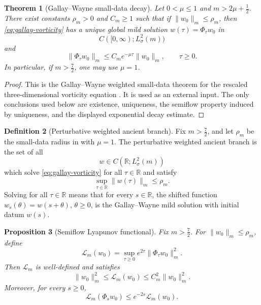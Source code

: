 \documentclass[11pt]{amsart}
\theoremstyle{plain}
\newtheorem{theorem}{Theorem}[section]
\newtheorem{proposition}[theorem]{Proposition}
\theoremstyle{definition}
\newtheorem{definition}[theorem]{Definition}
\theoremstyle{remark}
\numberwithin{equation}{section}
\begin{document}
\begin{theorem}[Gallay--Wayne small-data decay]\label{thm:gallay}
Let \(0<\mu\le1\) and \(m>2\mu+\frac12\).  There exist constants
\(\rho_m>0\) and \(C_m\ge1\) such that if
\(\|w_0\|_m\le\rho_m\), then \eqref{eq:gallay-vorticity} has a unique global
mild solution \(w(\tau)=\Phi_\tau w_0\) in
\[
   C([0,\infty);L^2_\sigma(m))
\]
and
\[
   \|\Phi_\tau w_0\|_m
   \le
   C_m e^{-\mu\tau}\|w_0\|_m,\qquad \tau\ge0.
\]
In particular, if \(m>\frac72\), one may use \(\mu=1\).
\end{theorem}

\begin{proof}
This is the Gallay--Wayne weighted small-data theorem for the rescaled
three-dimensional vorticity equation \cite{GallayWayne2002}.  It is used as
an external input.  The only conclusions used below are existence, uniqueness,
the semiflow property induced by uniqueness, and the displayed exponential
decay estimate.
\end{proof}

\begin{definition}[Perturbative weighted ancient branch]\label{def:weighted-branch}
Fix \(m>\frac72\), and let \(\rho_m\) be the small-data radius in
 with \(\mu=1\).  The perturbative weighted ancient branch is
the set of all
\[
   w\in C(\mathbb R;L^2_\sigma(m))
\]
which solve \eqref{eq:gallay-vorticity} for all \(\tau\in\mathbb R\) and
satisfy
\[
   \sup_{\tau\in\mathbb R}\|w(\tau)\|_m\le\rho_m .
\]
Solving for all \(\tau\in\mathbb R\) means that for every \(s\in\mathbb R\),
the shifted function \(w_s(\theta)=w(s+\theta)\), \(\theta\ge0\), is the
Gallay--Wayne mild solution with initial datum \(w(s)\).
\end{definition}

\begin{proposition}[Semiflow Lyapunov functional]\label{prop:weighted-lyap}
Fix \(m>\frac72\).  For \(\|w_0\|_m\le\rho_m\), define
\begin{equation}\label{eq:weighted-lyap}
   \mathcal L_m(w_0)
   =
   \sup_{\tau\ge0}e^{2\tau}\|\Phi_\tau w_0\|_m^2 .
\end{equation}
Then \(\mathcal L_m\) is well-defined and satisfies
\begin{equation}\label{eq:weighted-coercive}
   \|w_0\|_m^2
   \le
   \mathcal L_m(w_0)
   \le
   C_m^2\|w_0\|_m^2 .
\end{equation}
Moreover, for every \(s\ge0\),
\begin{equation}\label{eq:weighted-contract}
   \mathcal L_m(\Phi_s w_0)
   \le
   e^{-2s}\mathcal L_m(w_0).
\end{equation}
\end{proposition}
\end{document}
